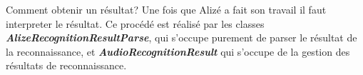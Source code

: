 Comment obtenir un résultat? Une fois que Alizé a fait son travail il faut interpreter le résultat. Ce procédé est réalisé par les classes \textbf{\textit{AlizeRecognitionResultParse}}, qui s'occupe purement de parser le résultat de la reconnaissance, et \textbf{\textit{AudioRecognitionResult}} qui s'occupe de la gestion des résultats de reconnaissance.


